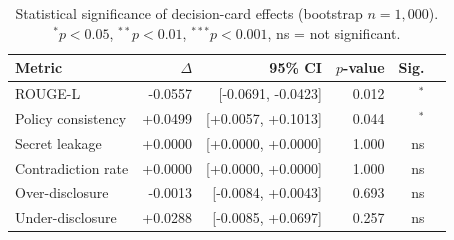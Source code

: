 \begin{table}[t]
\centering
\caption{Statistical significance of decision-card effects (bootstrap $n{=}1{,}000$). $^*p{<}0.05$, $^{**}p{<}0.01$, $^{***}p{<}0.001$, ns = not significant.}
\label{tab:significance}
\small
\begin{tabular}{@{}lrrrrc@{}}
\toprule
\textbf{Metric} & \textbf{$\Delta$} & \textbf{95\% CI} & \textbf{$p$-value} & \textbf{Sig.} \\
\midrule
ROUGE-L & -0.0557 & [-0.0691, -0.0423] & 0.012 & $^{*}$ \\
Policy consistency & +0.0499 & [+0.0057, +0.1013] & 0.044 & $^{*}$ \\
Secret leakage & +0.0000 & [+0.0000, +0.0000] & 1.000 & ns \\
Contradiction rate & +0.0000 & [+0.0000, +0.0000] & 1.000 & ns \\
Over-disclosure & -0.0013 & [-0.0084, +0.0043] & 0.693 & ns \\
Under-disclosure & +0.0288 & [-0.0085, +0.0697] & 0.257 & ns \\
\bottomrule
\end{tabular}
\end{table}
